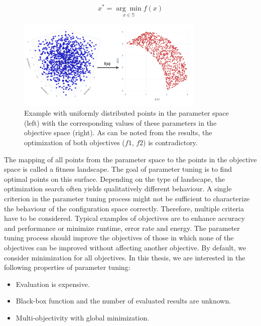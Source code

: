                 \begin{equation} \label{eq:arg_min}
                    x^* = \underset{x \in \mathbb{S}}{\arg\min} f(x)
                \end{equation}

        \begin{figure}
            \centering 
            \includegraphics[width=0.8\textwidth]{content/images/utility/spaces}
            \caption[Example with uniformly distributed points in the parameter space (left) with the corresponding values of these parameters in the objective space]{Example with uniformly distributed points in the parameter space (left) with the corresponding values of these parameters in the objective space (right). As can be noted from the results, the optimization of both objectives ($f1$, $f2$) is contradictory.} 
            \label{fig:spaces} 
        \end{figure}

        The mapping of all points from the parameter space to the points in the objective space is called a fitness landscape. The goal of parameter tuning is to find optimal points on this surface. Depending on the type of landscape, the optimization search often yields qualitatively different behaviour.
        A single criterion in the parameter tuning process might not be sufficient to characterize the behaviour of the configuration space correctly. Therefore, multiple criteria have to be considered. Typical examples of objectives are to enhance accuracy and performance or minimize runtime, error rate and energy. The parameter tuning process should improve the objectives of those in which none of the objectives can be improved without affecting another objective. By default, we consider minimization for all objectives. 
        In this thesis, we are interested in the following properties of parameter tuning:
        \begin{itemize}
            \item Evaluation is expensive.
            \item Black-box function and the number of evaluated results are unknown.
            \item Multi-objectivity with global minimization.
        \end{itemize}

